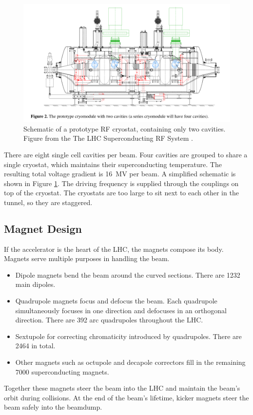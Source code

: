 \begin{figure}[h!]
\captionsetup[subfigure]{position=b}
\centering
    \includegraphics[width=1\textwidth]{figures/experiment/rfproto.png}
\caption{Schematic of a prototype RF cryostat, containing only two cavities. Figure from the The LHC Superconducting RF System \cite{boussard}.}
\label{fig:cavities}
\end{figure}

There are eight single cell cavities per beam.
Four cavities are grouped to share a single cryostat, which maintains their superconducting temperature.
The resulting total voltage gradient is 16~MV per beam.
A simplified schematic is shown in Figure \ref{fig:cavities}.
The driving frequency is supplied through the couplings on top of the cryostat.
The cryostats are too large to sit next to each other in the tunnel, so they are staggered.

\subsection{Magnet Design}
If the accelerator is the heart of the LHC, the magnets compose its body.
Magnets serve multiple purposes in handling the beam.
\begin{itemize}
    \item Dipole magnets bend the beam around the curved sections.  There are 1232 main dipoles.
    \item Quadrupole magnets focus and defocus the beam. Each quadrupole simultaneously focuses in one direction and defocuses in an orthogonal direction. There are 392 arc quadrupoles throughout the LHC.
    \item Sextupole for correcting chromaticity introduced by quadrupoles. There are 2464 in total.
    \item Other magnets such as octupole and decapole correctors fill in the remaining 7000 superconducting magnets.
\end{itemize}
Together these magnets steer the beam into the LHC and maintain the beam's orbit during collisions.
At the end of the beam's lifetime, kicker magnets steer the beam safely into the beamdump.

